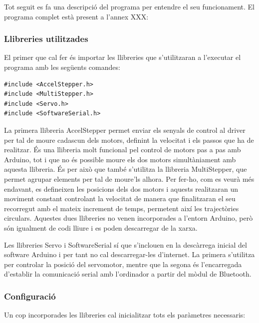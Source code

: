 Tot seguit es fa una descripció del programa per entendre el seu funcionament. El programa complet està present a l’annex XXX:

\subsubsection{Llibreries utilitzades}

El primer que cal fer és importar les llibreries que s’utilitzaran a l'executar el programa amb les següents comandes:
 
\begin{lstlisting}[style=Arduino]
#include <AccelStepper.h>
#include <MultiStepper.h>
#include <Servo.h>
#include <SoftwareSerial.h>
\end{lstlisting}

La primera llibreria AccelStepper permet enviar els senyals de control al driver per tal de moure cadascun dels motors, definint la velocitat i els passos que ha de realitzar. És una llibreria molt funcional pel control de motors pas a pas amb Arduino, tot i que no és possible moure els dos motors simultàniament amb aquesta llibreria. És per això que també s’utilitza la llibreria MultiStepper, que permet agrupar elements per tal de moure’ls alhora. Per fer-ho, com es veurà més endavant, es defineixen les posicions dels dos motors i aquests realitzaran un moviment constant controlant la velocitat de manera que finalitzaran el seu recorregut amb el mateix increment de temps, permetent així les trajectòries circulars. Aquestes dues llibreries no venen incorporades a l'entorn Arduino, però són igualment de codi lliure i es poden descarregar de la xarxa.
 
Les llibreries Servo i SoftwareSerial sí que s’inclouen en la descàrrega inicial del software Arduino i per tant no cal descarregar-les d’internet. La primera s’utilitza per controlar la posició del servomotor, mentre que la segona és l’encarregada d’establir la comunicació serial amb l’ordinador a partir del mòdul de Bluetooth. 

\subsubsection{Configuració}

Un cop incorporades les llibreries cal inicialitzar tots els paràmetres necessaris: 

